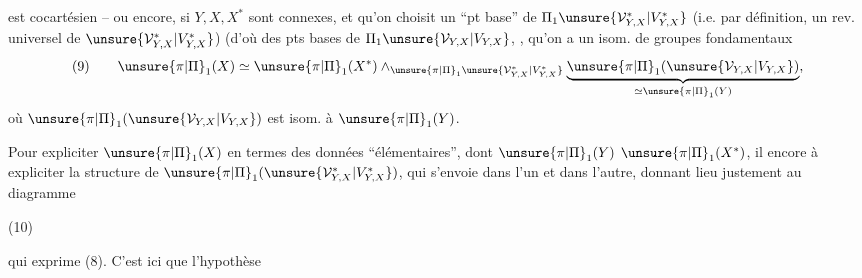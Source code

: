 
est cocartésien -- ou encore, si $Y,X,X^*$ sont connexes, et qu'on choisit un ``pt base'' de $\Pi_1\unsure{\mathcal V_{Y,X}^*|V_{Y,X}^*}$ (i.e. par définition, un rev. universel de $\unsure{\mathcal V_{Y,X}^*|V_{Y,X}^*}$) (d'où des pts bases de $\Pi_1\unsure{\mathcal V_{Y,X}|V_{Y,X}}$, , qu'on a un isom.  de groupes fondamentaux
\[
(9)\qquad \unsure{\pi|\Pi}_1(X)\simeq\unsure{\pi|\Pi}_1(X^*)\wedge_{\unsure{\pi|\Pi}_1\unsure{\mathcal V_{Y,X}^*|V_{Y,X}^*}}\underbrace{\unsure{\pi|\Pi}_1(\unsure{\mathcal V_{Y,X}|V_{Y,X}})}_{\simeq\unsure{\pi|\Pi}_1(Y)},
\]
où $\unsure{\pi|\Pi}_1(\unsure{\mathcal V_{Y,X}|V_{Y,X}})$ est isom.  à $\unsure{\pi|\Pi}_1(Y)$.


Pour expliciter $\unsure{\pi|\Pi}_1(X)$ en termes des données ``élémentaires'',  dont $\unsure{\pi|\Pi}_1(Y)$  $\unsure{\pi|\Pi}_1(X^*)$,  il  encore à expliciter la structure de $\unsure{\pi|\Pi}_1(\unsure{\mathcal V_{Y,X}^*|V_{Y,X}^*})$, qui s'envoie dans l'un et dans l'autre, donnant lieu justement au diagramme


(10)

qui exprime (8). C'est ici que l'hypothèse

